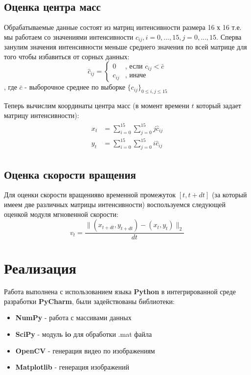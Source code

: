 \documentclass[12pt,a4paper]{article}
\begin{document}
\subsection{Оценка центра масс}
Обрабатываемые данные состоят из матриц интенсивности размера 16 х 16 т.е. мы работаем со значениями интенсивности $c_{ij}, i = 0, ..., 15, j = 0, ..., 15$. Сперва занулим значения интенсивности меньше среднего значения по всей матрице для того чтобы избавиться от сорных данных:
\begin{equation}
	\hat{c}_{ij} = 
	\begin{cases}
		0 &\text{, если } c_{ij} < \bar{c}  \\
		c_{ij} &\text{, иначе}
	\end{cases}
\end{equation}
, где $\bar{c}$ - выборочное среднее\cite{verrazdely} по выборке $\{c_{ij}\}_{0 \leq i,j \leq 15}$

Теперь вычислим координаты центра масс (в момент времени $t$ который задает матрицу интенсивности):
\begin{align}
\begin{split}
	x_t &= \sum_{i=0}^{15}{\sum_{j=0}^{15}{j\hat{c}_{ij}}} \\
	y_t &= \sum_{i=0}^{15}{\sum_{j=0}^{15}{i\hat{c}_{ij}}}
\end{split}
\end{align}

\subsection{Оценка скорости вращения}
Для оценки скорости вращенияво временной промежуток $[t, t + dt]$ (за который имеем две различных матрицы интенсивности) воспользуемся следующей оценкой модуля мгновенной скорости\cite{speed}:
\begin{equation}
	v_t = \frac{\|(x_{t+dt}, y_{t+dt}) - (x_t, y_t)\|_2}{dt}
\end{equation}
\pagebreak

\section{Реализация}
Работа выполнена с использованием языка \textbf{Python} в интегрированной среде разработки \textbf{PyCharm}, были задействованы библиотеки:

\begin{itemize}
	\item \textbf{NumPy} - работа с массивами данных
	\item \textbf{SciPy} - модуль \textbf{io} для обработки .mat файла 
	\item \textbf{OpenCV} - генерация видео по изображениям
	\item \textbf{Matplotlib} - генерация изображений
\end{itemize}
\pagebreak
\end{document}
